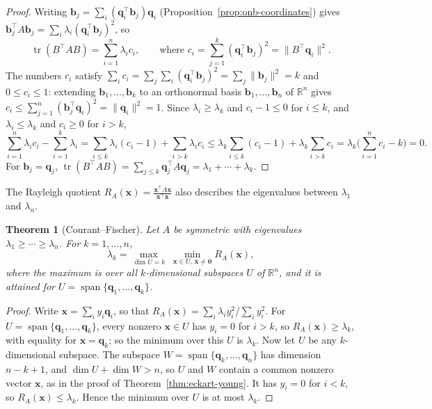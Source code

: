 \documentclass[11pt]{article}
\newcommand{\norm}[1]{\lVert #1 \rVert}
\theoremstyle{definition}
\theoremstyle{plain}
\newtheorem{theorem}[definition]{Theorem}
\theoremstyle{remark}
\DeclareMathOperator{\Span}{span}
\DeclareMathOperator{\tr}{tr}
\begin{document}
\begin{proof}
    Writing $\mathbf{b}_j = \sum_i (\mathbf{q}_i^\top \mathbf{b}_j)\mathbf{q}_i$ (Proposition~\ref{prop:onb-coordinates}) gives $\mathbf{b}_j^\top A\mathbf{b}_j = \sum_i \lambda_i (\mathbf{q}_i^\top \mathbf{b}_j)^2$, so
    \[\tr(B^\top AB) = \sum_{i=1}^n \lambda_i c_i, \qquad \text{where } c_i = \sum_{j=1}^k (\mathbf{q}_i^\top \mathbf{b}_j)^2 = \norm{B^\top \mathbf{q}_i}^2.\]
    The numbers $c_i$ satisfy $\sum_i c_i = \sum_j \sum_i (\mathbf{q}_i^\top \mathbf{b}_j)^2 = \sum_j \norm{\mathbf{b}_j}^2 = k$ and $0 \leq c_i \leq 1$: extending $\mathbf{b}_1, \ldots, \mathbf{b}_k$ to an orthonormal basis $\mathbf{b}_1, \ldots, \mathbf{b}_n$ of $\mathbb{R}^n$ gives $c_i \leq \sum_{j=1}^n (\mathbf{b}_j^\top \mathbf{q}_i)^2 = \norm{\mathbf{q}_i}^2 = 1$. Since $\lambda_i \geq \lambda_k$ and $c_i - 1 \leq 0$ for $i \leq k$, and $\lambda_i \leq \lambda_k$ and $c_i \geq 0$ for $i > k$,
    \[\sum_{i=1}^n \lambda_i c_i - \sum_{i=1}^k \lambda_i = \sum_{i \leq k} \lambda_i(c_i - 1) + \sum_{i > k} \lambda_i c_i \leq \lambda_k\sum_{i \leq k}(c_i - 1) + \lambda_k\sum_{i > k} c_i = \lambda_k\Big(\sum_{i=1}^n c_i - k\Big) = 0.\]
    For $\mathbf{b}_j = \mathbf{q}_j$, $\tr(B^\top AB) = \sum_{j \leq k} \mathbf{q}_j^\top A\mathbf{q}_j = \lambda_1 + \cdots + \lambda_k$.
\end{proof}

The Rayleigh quotient $R_A(\mathbf{x}) = \frac{\mathbf{x}^\top A\mathbf{x}}{\mathbf{x}^\top\mathbf{x}}$ also describes the eigenvalues between $\lambda_1$ and $\lambda_n$.

\begin{theorem}[Courant--Fischer]\label{thm:courant-fischer}
    Let $A$ be symmetric with eigenvalues $\lambda_1 \geq \cdots \geq \lambda_n$. For $k = 1, \ldots, n$,
    \[\lambda_k = \max_{\dim U = k}\; \min_{\mathbf{x} \in U, \, \mathbf{x} \neq \mathbf{0}} R_A(\mathbf{x}),\]
    where the maximum is over all $k$-dimensional subspaces $U$ of $\mathbb{R}^n$, and it is attained for $U = \Span\{\mathbf{q}_1, \ldots, \mathbf{q}_k\}$.
\end{theorem}

\begin{proof}
    Write $\mathbf{x} = \sum_i y_i\mathbf{q}_i$, so that $R_A(\mathbf{x}) = \sum_i \lambda_iy_i^2 / \sum_i y_i^2$. For $U = \Span\{\mathbf{q}_1, \ldots, \mathbf{q}_k\}$, every nonzero $\mathbf{x} \in U$ has $y_i = 0$ for $i > k$, so $R_A(\mathbf{x}) \geq \lambda_k$, with equality for $\mathbf{x} = \mathbf{q}_k$; so the minimum over this $U$ is $\lambda_k$. Now let $U$ be any $k$-dimensional subspace. The subspace $W = \Span\{\mathbf{q}_k, \ldots, \mathbf{q}_n\}$ has dimension $n - k + 1$, and $\dim U + \dim W > n$, so $U$ and $W$ contain a common nonzero vector $\mathbf{x}$, as in the proof of Theorem~\ref{thm:eckart-young}. It has $y_i = 0$ for $i < k$, so $R_A(\mathbf{x}) \leq \lambda_k$. Hence the minimum over $U$ is at most $\lambda_k$.
\end{proof}
\end{document}
